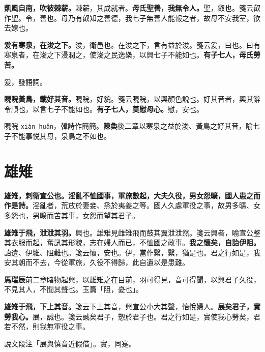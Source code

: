 \textbf{凱風自南，吹彼棘薪。}{\footnotesize 棘薪，其成就者。}\textbf{母氏聖善，我無令人。}{\footnotesize 聖，叡也。箋云叡作聖。令，善也。母乃有叡知之善德，我七子無善人能報之者，故母不安我室，欲去嫁也。}

\textbf{爰有寒泉，在浚之下。}{\footnotesize 浚，衛邑也。在浚之下，言有益於浚。箋云爰，曰也。曰有寒泉者，在浚之下浸潤之，使浚之民逸樂，以興七子不能如也。}\textbf{有子七人，母氏勞苦。}

\begin{quoting}爰，發語詞。\end{quoting}

\textbf{睍睆黃鳥，載好其音。}{\footnotesize 睍睆，好貌。箋云睍睆，以興顏色說也。好其音者，興其辭令順也，以言七子不能如也。}\textbf{有子七人，莫慰母心。}{\footnotesize 慰，安也。}

\begin{quoting}睍睆 \texttt{xiàn huǎn}，韓詩作簡簡。\textbf{陳奐}後二章以寒泉之益於浚、黃鳥之好其音，喻七子不能事悦其母，泉鳥之不如也。\end{quoting}

\section{雄雉}


\textbf{雄雉，刺衛宣公也。淫亂不恤國事，軍旅數起，大夫久役，男女怨曠，國人患之而作是詩。}{\footnotesize 淫亂者，荒放於妻妾、烝於夷姜之等。國人久處軍役之事，故男多曠、女多怨也，男曠而苦其事，女怨而望其君子。}

\textbf{雄雉于飛，泄泄其羽。}{\footnotesize 興也。雄雉見雌雉飛而鼓其翼泄泄然。箋云興者，喻宣公整其衣服而起，奮訊其形貌，志在婦人而已，不恤國之政事。}\textbf{我之懷矣，自詒伊阻。}{\footnotesize 詒遺、伊維、阻難也。箋云懷，安也。伊，當作繄，繄，猶是也。君之行如是，我安其朝而不去，今從軍旅，久役不得歸，此自遺以是患難。}

\begin{quoting}\textbf{馬瑞辰}前二章睹物起興，以雄雉之在目前，羽可得見，音可得聞，以興君子久役，不見其人，不聞其聲也。玉篇「阻，憂也」。\end{quoting}

\textbf{雄雉于飛，下上其音。}{\footnotesize 箋云下上其音，興宣公小大其聲，怡悅婦人。}\textbf{展矣君子，實勞我心。}{\footnotesize 展，誠也。箋云誠矣君子，愬於君子也。君之行如是，實使我心勞矣，君若不然，則我無軍役之事。}

\begin{quoting}說文段注「展與慎音近假借」。實，同寔。\end{quoting}

